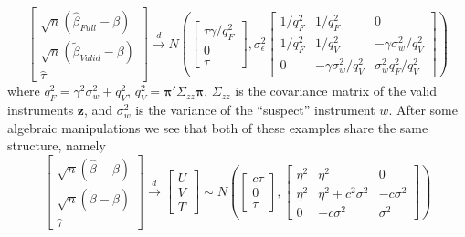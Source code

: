 \begin{equation*}
  \left[ 
  \begin{array}{c}
    \sqrt{n} \left( \widehat{\beta}_{Full} - \beta \right)\\
    \sqrt{n} \left( \widetilde{\beta}_{Valid} - \beta \right)\\
    \widehat{\tau}
\end{array}
\right] \overset{d}{\rightarrow} N\left( \left[
\begin{array}{c}
  \tau\gamma/q^2_{F} \\ 0 \\ \tau
\end{array}
\right], \sigma_{\epsilon}^2 
\left[
\begin{array}{ccc}
  1/q_{F}^2 & 1/q_{F}^2 & 0\\
  1/q_{F}^2 & 1/q_{V}^2 & -\gamma\sigma_w^2/q^2_{V}\\ 
  0 & -\gamma\sigma_w^2/q^2_{V} & \sigma_w^2 q^2_{F}/q^2_{V}
\end{array}
\right]\right)
\end{equation*}
where $q^2_{F} = \gamma^2 \sigma_w^2 + q^2_{V}$, $q^2_{V} = \boldsymbol{\pi}'\Sigma_{zz}\boldsymbol{\pi}$, $\Sigma_{zz}$ is the covariance matrix of the valid instruments $\mathbf{z}$, and $\sigma_w^2$ is the variance of the ``suspect'' instrument $w$.
After some algebraic manipulations we see that both of these examples share the same structure, namely
\begin{equation}
  \left[ 
  \begin{array}{c}
    \sqrt{n} \left( \widehat{\beta} - \beta \right)\\
    \sqrt{n} \left( \widetilde{\beta} - \beta \right)\\
    \widehat{\tau}
\end{array}
\right] \overset{d}{\rightarrow} 
\left[
\begin{array}{c}
  U \\ V \\ T
\end{array}
\right] \sim
N\left( \left[
\begin{array}{c}
  c\tau\\ 0 \\ \tau
\end{array}
\right], 
\left[
\begin{array}{ccc}
  \eta^2 & \eta^2 & 0\\
  \eta^2 & \eta^2 + c^2 \sigma^2 & -c\sigma^2\\ 
  0 & -c\sigma^2 & \sigma^2 
\end{array}
\right]\right)
\label{eq:LimitExperiment}
\end{equation}
